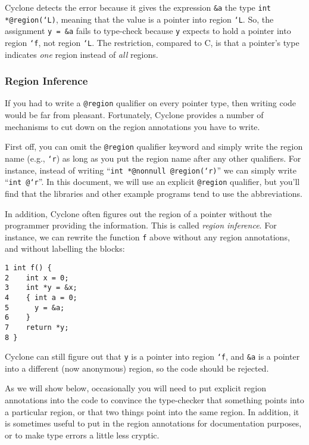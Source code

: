 Cyclone detects the error because it gives the expression \texttt{\&a}
the type \texttt{int *@region(`L)}, meaning that the value is a
pointer into region \texttt{`L}.  So, the assignment \texttt{y = \&a}
fails to type-check because \texttt{y} expects to hold a pointer into
region \texttt{`f}, not region \texttt{`L}.  The restriction, compared
to C, is that a pointer's type indicates \emph{one} region instead of
\emph{all} regions.

\subsubsection*{Region Inference}

If you had to write a \texttt{@region} qualifier on every
pointer type, then writing code would be far from pleasant.
Fortunately, Cyclone provides a number of mechanisms to
cut down on the region annotations you have to write.  

First off, you can omit the \texttt{@region} qualifier keyword
and simply write the region name (e.g., \texttt{`r}) as long
as you put the region name after any other qualifiers.  For
instance, instead of writing ``\texttt{int *@nonnull @region(`r)}''
we can simply write ``\texttt{int @`r}''.  In this document,
we will use an explicit \texttt{@region} qualifier, but
you'll find that the libraries and other example programs tend
to use the abbreviations.  

In addition, Cyclone often figures out the region of a pointer
without the programmer providing the information.  This is called {\em
region inference}.  For instance, we can rewrite the function
\texttt{f} above without any region annotations, and without 
labelling the blocks:
\begin{verbatim}
1 int f() {
2    int x = 0;
3    int *y = &x;
4    { int a = 0;
5      y = &a;
6    }
7    return *y;
8 }
\end{verbatim}
Cyclone can still figure out that \texttt{y} is a pointer into
region \texttt{`f}, and \texttt{\&a} is a pointer into a different
(now anonymous) region, so the code should be rejected.

As we will show below, occasionally you will need to put explicit
region annotations into the code to convince the type-checker that
something points into a particular region, or that two things point
into the same region.  In addition, it is sometimes useful to put in
the region annotations for documentation purposes, or to make type
errors a little less cryptic.

